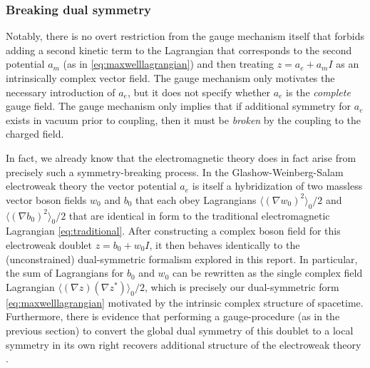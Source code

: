 \documentclass[1p,sort&compress]{elsarticle}
\numberwithin{equation}{section}
\newcommand{\mean}[1]{\langle #1 \rangle}
\begin{document}
\subsubsection{Breaking dual symmetry}\label{sec:symmetry}


Notably, there is no overt restriction from the gauge mechanism itself that forbids adding a second kinetic term to the Lagrangian that corresponds to the second potential $a_m$ (as in \eqref{eq:maxwelllagrangian}) and then treating $z = a_e + a_m I$ as an intrinsically complex vector field.  The gauge mechanism only motivates the necessary introduction of $a_e$, but it does not specify whether $a_e$ is the \emph{complete} gauge field.  The gauge mechanism only implies that if additional symmetry for $a_e$ exists in vacuum prior to coupling, then it must be \emph{broken} by the coupling to the charged field.

In fact, we already know that the electromagnetic theory does in fact arise from precisely such a symmetry-breaking process.  In the Glashow-Weinberg-Salam electroweak theory \cite{Glashow1961,Weinberg1961,Salam1968} the vector potential $a_e$ is itself a hybridization of two massless vector boson fields $w_0$ and $b_0$ that each obey Lagrangians $\mean{(\nabla w_0)^2}_0/2$ and $\mean{(\nabla b_0)^2}_0/2$ that are identical in form to the traditional electromagnetic Lagrangian \eqref{eq:traditional}.  After constructing a complex boson field for this electroweak doublet $z = b_0 + w_0 I$, it then behaves identically to the (unconstrained) dual-symmetric formalism explored in this report.  In particular, the sum of Lagrangians for $b_0$ and $w_0$ can be rewritten as the single complex field Lagrangian $\mean{(\nabla z)(\nabla z^*)}_0/2$, which is precisely our dual-symmetric form \eqref{eq:maxwelllagrangian} motivated by the intrinsic complex structure of spacetime.  Furthermore, there is evidence that performing a gauge-procedure (as in the previous section) to convert the global dual symmetry of this doublet to a local symmetry in its own right recovers additional structure of the electroweak theory \cite{Vasconcellos2014}.
\end{document}
